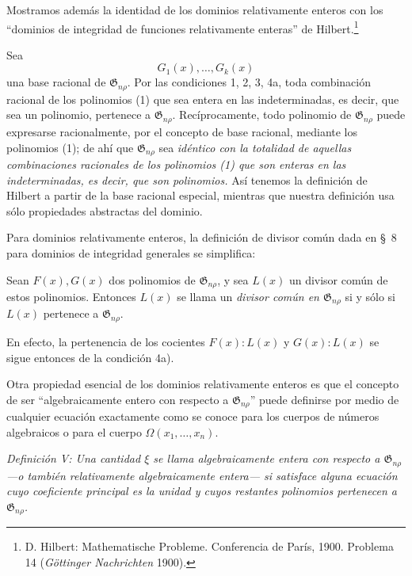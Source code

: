 \documentclass[11pt]{article}
\providecommand{\Gdom}{\mathfrak{G}}
\begin{document}
Mostramos además la identidad de los dominios relativamente enteros con los ``dominios de integridad de funciones relativamente enteras'' de Hilbert.\footnote{D. Hilbert: Mathematische Probleme. Conferencia de París, 1900. Problema 14 (\emph{Göttinger Nachrichten} 1900).}

Sea
\begin{equation}
  G_1(x),\ldots,G_k(x)
\tag{1}
\end{equation}
una base racional de $\Gdom_{n\rho}$. Por las condiciones 1, 2, 3, 4a, toda combinación racional de los polinomios (1) que sea entera en las indeterminadas, es decir, que sea un polinomio, pertenece a $\Gdom_{n\rho}$. Recíprocamente, todo polinomio de $\Gdom_{n\rho}$ puede expresarse racionalmente, por el concepto de base racional, mediante los polinomios (1); de ahí que $\Gdom_{n\rho}$ sea \emph{idéntico con la totalidad de aquellas combinaciones racionales de los polinomios (1) que son enteras en las indeterminadas, es decir, que son polinomios.} Así tenemos la definición de Hilbert a partir de la base racional especial, mientras que nuestra definición usa sólo propiedades abstractas del dominio.

Para dominios relativamente enteros, la definición de divisor común dada en \S\ 8 para dominios de integridad generales se simplifica:

Sean $F(x),G(x)$ dos polinomios de $\Gdom_{n\rho}$, y sea $L(x)$ un divisor común de estos polinomios. Entonces $L(x)$ se llama un \emph{divisor común en $\Gdom_{n\rho}$} si y sólo si $L(x)$ pertenece a $\Gdom_{n\rho}$.

En efecto, la pertenencia de los cocientes $F(x):L(x)$ y $G(x):L(x)$ se sigue entonces de la condición 4a).

Otra propiedad esencial de los dominios relativamente enteros es que el concepto de ser ``algebraicamente entero con respecto a $\Gdom_{n\rho}$'' puede definirse por medio de cualquier ecuación exactamente como se conoce para los cuerpos de números algebraicos o para el cuerpo $\Omega(x_1,\ldots,x_n)$.

\emph{Definición V: Una cantidad $\xi$ se llama algebraicamente entera con respecto a $\Gdom_{n\rho}$ ---o también relativamente algebraicamente entera--- si satisface alguna ecuación cuyo coeficiente principal es la unidad y cuyos restantes polinomios pertenecen a $\Gdom_{n\rho}$.}
\end{document}
